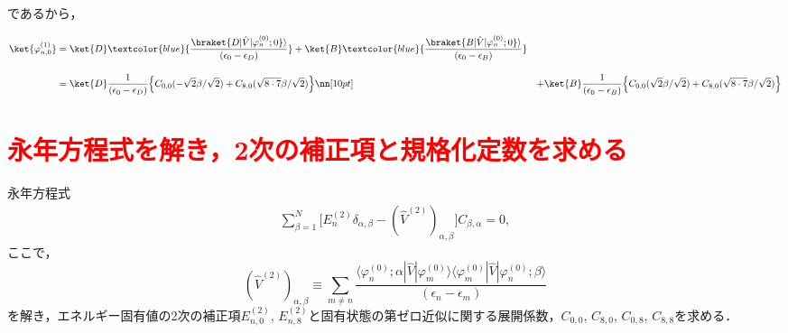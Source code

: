 であるから，

\begin{align}
    \ket{\varphi_{n,0}^{(1)}}
    &=
    \ket{D}
    \textcolor{blue}{
    \frac{\braket{D|\hat{V}|\varphi^{(0)}_n;0}\rangle}{(\epsilon_{0}-\epsilon_D)}}
    +
    \ket{B}
    \textcolor{blue}{
    \frac{\braket{B|\hat{V}|\varphi^{(0)}_n;0}\rangle}{(\epsilon_0-\epsilon_B)}}\\[10pt]
    &=\ket{D}
    \frac{1}{(\epsilon_{0}-\epsilon_D)}
    \Bigl\{C_{0,0}(-\sqrt{2}\beta/\sqrt{2}) + C_{8,0} (\sqrt{8\cdot7}\beta/\sqrt{2})\Bigr\}\nn[10pt]
    &+
    \ket{B}
    \frac{1}{(\epsilon_{0}-\epsilon_B)}
    \Bigl\{C_{0,0}(\sqrt{2}\beta/\sqrt{2}) + C_{8,0} (\sqrt{8\cdot7}\beta/\sqrt{2})\Bigr\}
\end{align}






\section*{\textcolor{red}{永年方程式を解き，2次の補正項と規格化定数を求める}}
永年方程式
\begin{align}\label{2ndpertubation_matrix}
\sum_{\beta=1}^{N}\Biggl[
E^{(2)}_n \delta_{\alpha,\beta}
-(\hat{V}^{(2)})_{\alpha,\beta}
\biggr]C_{\beta,\alpha}=0,
\end{align}
ここで，
\begin{equation}
    (\hat{V}^{(2)})_{\alpha,\beta}
    \equiv\sum_{m\neq n}
    \frac{\langle{\varphi^{(0)}_n;\alpha|\hat{V}|\varphi^{(0)}_m}\rangle
    \langle{\varphi^{(0)}_{m}|\hat{V}|\varphi^{(0)}_n;\beta}\rangle}
    {(\epsilon_n-\epsilon_m)}
\end{equation}
を解き，エネルギー固有値の2次の補正項$E_{n,0}^{(2)}$, $E_{n,8}^{(2)}$と固有状態の第ゼロ近似に関する展開係数，$C_{0,0}$, $C_{8,0}$, $C_{0,8}$, $C_{8,8}$を求める．





